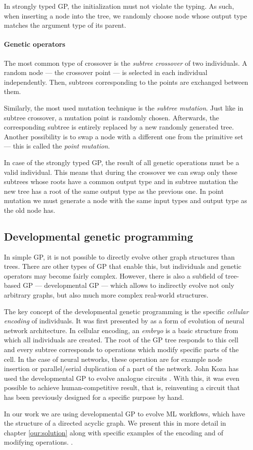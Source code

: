 In strongly typed GP, the initialization must not violate the typing. As such,
when inserting a node into the tree, we randomly choose node whose output type
matches the argument type of its parent.

\paragraph{Genetic operators} \label{treeops}
The most common type of crossover is the \emph{subtree crossover} of two
individuals. A random node --- the crossover point ---
is selected in each individual independently. Then, subtrees corresponding
to the points are exchanged between them.

Similarly, the most used mutation technique is the \emph{subtree mutation}.
Just like in subtree crossover, a mutation point is randomly chosen.
Afterwards, the corresponding subtree is entirely replaced by a new randomly
generated tree. Another possibility is to swap a node with a different one
from the primitive set --- this is called the \emph{point mutation}.

In case of the strongly typed GP, the result of all genetic operations must
be a valid individual. This means that during the crossover we can swap only
these subtrees whose roots have a common output type and in subtree mutation
the new tree has a root of the same output type as the previous one. In point
mutation we must generate a node with the same input types and output type as
the old node has.
\citep{Poli:2008:FGG:1796422}

\subsection{Developmental genetic programming} \label{devGP}
In simple GP, it is not possible to directly evolve other graph structures
than trees. There are other types of GP that enable this, but individuals
and genetic operators may become fairly complex. However, there is also a
subfield of tree-based GP --- developmental GP --- which allows to indirectly
evolve not only arbitrary graphs, but also much more complex real-world
structures.

The key concept of the developmental genetic programming is the
specific \emph{cellular encoding} of individuals. It was first presented by
\cite{Gruau:1994:thesis} as a form of evolution of neural network architecture.
In cellular encoding, an \emph{embryo} is a basic structure from which all
individuals are created.
The root of the GP tree responds to this cell and every subtree corresponds
to operations which modify specific parts of the cell. In the case of neural
networks, these operation are for example node insertion or parallel/serial
duplication of a part of the network. John Koza has used the developmental GP
to evolve analogue circuits \citep{Koza:1998:circuits}. With this, it was even
possible to achieve human-competitive result, that is, reinventing a circuit
that has been previously designed for a specific purpose by hand.

In our work we are using developmental GP to evolve ML workflows, which have
the structure of a directed acyclic graph. We present this in more detail in
chapter \ref{our:solution} along with specific examples of the encoding and
of modifying operations.
.